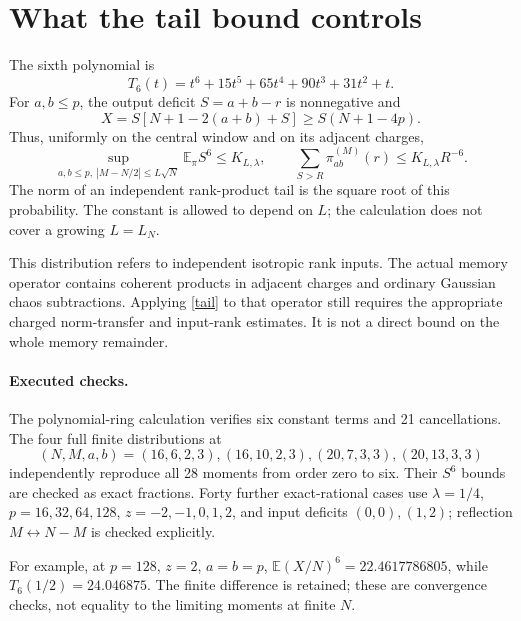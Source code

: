 \documentclass[11pt,a4paper]{article}
\newcommand{\EE}{\mathbb E}
\begin{document}
\newpage
\section{What the tail bound controls}
The sixth polynomial is
\begin{equation}
 T_6(t)=t^6+15t^5+65t^4+90t^3+31t^2+t.
\end{equation}
For $a,b\le p$, the output deficit $S=a+b-r$ is nonnegative and
\begin{equation}
 X=S[N+1-2(a+b)+S]\ge S(N+1-4p).
\end{equation}
Thus, uniformly on the central window and on its adjacent charges,
\begin{equation}
 \sup_{a,b\le p,\ |M-N/2|\le L\sqrt N}\EE_\pi S^6
 \le K_{L,\lambda},\qquad
 \sum_{S>R}\pi_{ab}^{(M)}(r)\le K_{L,\lambda}R^{-6}.
 \label{tail}
\end{equation}
The norm of an independent rank-product tail is the square root
of this probability. The constant is allowed to depend on $L$;
the calculation does not cover a growing $L=L_N$.

This distribution refers to independent isotropic rank inputs.
The actual memory operator contains coherent products in adjacent
charges and ordinary Gaussian chaos subtractions. Applying
\eqref{tail} to that operator still requires the appropriate
charged norm-transfer and input-rank estimates. It is not a direct
bound on the whole memory remainder.

\paragraph{Executed checks.}
The polynomial-ring calculation verifies six constant terms and
21 cancellations. The four full finite distributions at
\[
 (N,M,a,b)=(16,6,2,3),(16,10,2,3),(20,7,3,3),(20,13,3,3)
\]
independently reproduce all 28 moments from order zero to six.
Their $S^6$ bounds are checked as exact fractions. Forty further
exact-rational cases use $\lambda=1/4$, $p=16,32,64,128$,
$z=-2,-1,0,1,2$, and input deficits $(0,0),(1,2)$; reflection
$M\leftrightarrow N-M$ is checked explicitly.

For example, at $p=128$, $z=2$, $a=b=p$,
$\EE(X/N)^6=22.4617786805$, while $T_6(1/2)=24.046875$.
The finite difference is retained; these are convergence checks,
not equality to the limiting moments at finite $N$.

\newpage
\end{document}
